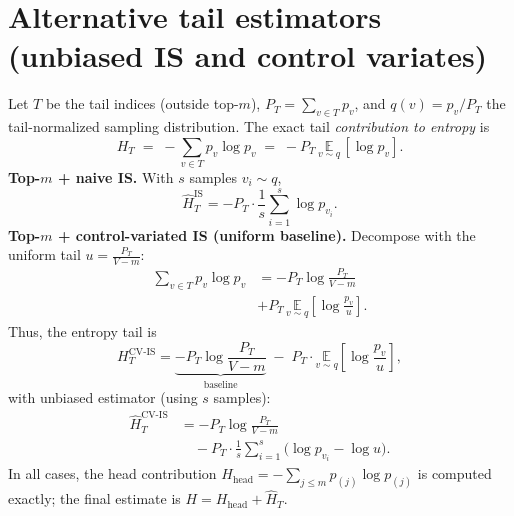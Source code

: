 \documentclass[11pt]{article}
\begin{document}
\section{Alternative tail estimators (unbiased IS and control variates)}
\label{app:tail-IS}
Let $T$ be the tail indices (outside top-$m$), $P_T=\sum_{v\in T}p_v$, and $q(v)=p_v/P_T$ the tail-normalized sampling distribution. The exact tail \emph{contribution to entropy} is
\[
	H_T \;=\; -\sum_{v\in T} p_v \log p_v \;=\; -P_T\,\underset{v\sim q}{\mathbb{E}}\,[\log p_v].
\]
\textbf{Top-$m$ + naive IS.} With $s$ samples $v_i\!\sim q$,
\[
	\widehat{H}_T^{\text{IS}}
	= -P_T \cdot \frac{1}{s}\sum_{i=1}^s \log p_{v_i}.
\]
\textbf{Top-$m$ + control-variated IS (uniform baseline).}
Decompose with the uniform tail $u=\tfrac{P_T}{V-m}$:
\begin{align*}
	\sum_{v\in T} p_v \log p_v
	&= -P_T\log\!\frac{P_T}{V-m} \\
	&+ P_T\,\underset{v\sim q}{\mathbb{E}}\!\left[\log\!\frac{p_v}{u}\right].
\end{align*}
Thus, the entropy tail is
\[
	H_T^{\text{CV-IS}}
	= \underbrace{-P_T\log\!\frac{P_T}{V-m}}_{\text{baseline}}
	\;-\; P_T \cdot \underset{v\sim q}{\mathbb{E}}\!\left[\log\!\frac{p_v}{u}\right],
\]
with unbiased estimator (using $s$ samples):
\begin{align*}
	\widehat{H}_T^{\text{CV-IS}}
	 & = -P_T\log\!\frac{P_T}{V-m}                                                 \\
	 & \quad - P_T \cdot \frac{1}{s}\sum_{i=1}^s \Big(\log p_{v_i} - \log u\Big).
\end{align*}
In all cases, the head contribution $H_{\text{head}}=-\sum_{j\le m}p_{(j)}\log p_{(j)}$ is computed exactly; the final estimate is $H=H_{\text{head}}+\widehat{H}_T$.
\end{document}
